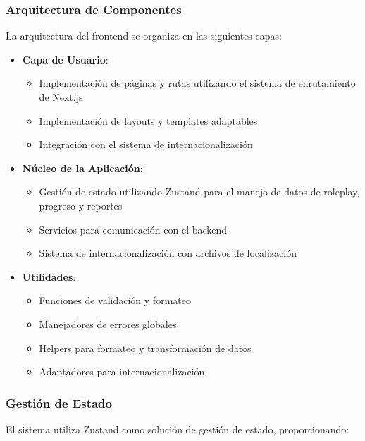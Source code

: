 \subsubsection{Arquitectura de Componentes}
La arquitectura del frontend se organiza en las siguientes capas:

\begin{itemize}
	\item \textbf{Capa de Usuario}:
	      \begin{itemize}
		      \item Implementación de páginas y rutas utilizando el sistema de enrutamiento de Next.js
		      \item Implementación de layouts y templates adaptables
		      \item Integración con el sistema de internacionalización
	      \end{itemize}

	\item \textbf{Núcleo de la Aplicación}:
	      \begin{itemize}
		      \item Gestión de estado utilizando Zustand para el manejo de datos de roleplay, progreso y reportes
		      \item Servicios para comunicación con el backend
		      \item Sistema de internacionalización con archivos de localización
	      \end{itemize}

	\item \textbf{Utilidades}:
	      \begin{itemize}
		      \item Funciones de validación y formateo
		      \item Manejadores de errores globales
		      \item Helpers para formateo y transformación de datos
		      \item Adaptadores para internacionalización
	      \end{itemize}
\end{itemize}

\subsubsection{Gestión de Estado}
\label{gestion-estado}

El sistema utiliza Zustand como solución de gestión de estado, proporcionando:

